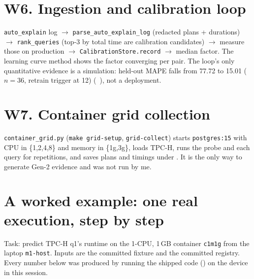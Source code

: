 \section{W6. Ingestion and calibration loop}
\texttt{auto\_explain} log $\to$ \texttt{parse\_auto\_explain\_log} (redacted plans + durations) $\to$ \texttt{rank\_queries} (top-3 by total time are
calibration candidates) $\to$ measure those on production $\to$ \texttt{CalibrationStore.record} $\to$ median factor. The learning curve method
shows the factor converging per pair. The loop's only quantitative evidence is a simulation: held-out MAPE falls from 77.72 to 15.01 ($n{=}36$, retrain trigger at 12)
(\evFILE\ ), not a deployment.

\section{W7. Container grid collection}
\texttt{container\_grid.py} (\texttt{make grid-setup}, \texttt{grid-collect}) starts \texttt{postgres:15} with CPU in \{1,2,4,8\} and memory in \{1g,3g\},
loads TPC-H, runs the probe and each query for repetitions, and saves plans and timings under . It is the only way to
generate Gen-2 evidence and was not run by me.

\section{A worked example: one real execution, step by step}\label{sec:worked}
Task: predict TPC-H q1's runtime on the 1-CPU, 1\,GB container \texttt{c1m1g} from the laptop \texttt{m1-host}. Inputs are the committed
fixture  and the committed registry. Every number below was produced by running the shipped code
(\evRUN) on the device in this session.


